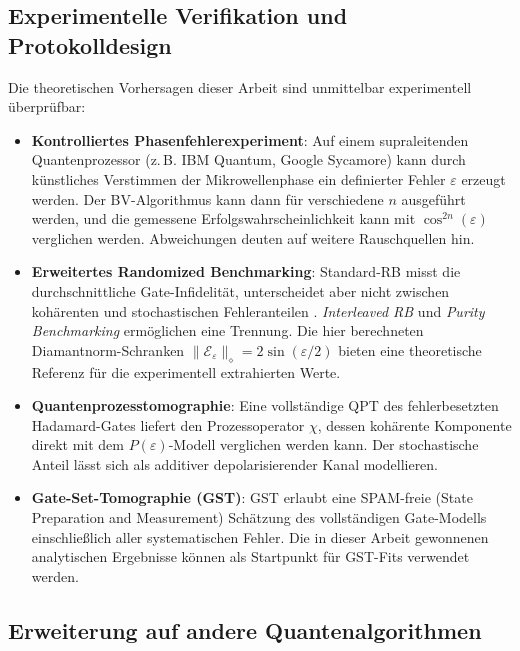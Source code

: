 ﻿\documentclass[11pt,a4paper]{article}
\theoremstyle{definition}
\newcommand{\eps}{\varepsilon}
\newcommand{\Fdiam}{\|\mathcal{E}_\eps\|_\diamond}
\begin{document}
\subsection{Experimentelle Verifikation und Protokolldesign}
\label{subsec:experiment}

Die theoretischen Vorhersagen dieser Arbeit sind unmittelbar experimentell
überprüfbar:

\begin{itemize}
  \item \textbf{Kontrolliertes Phasenfehlerexperiment}: Auf einem
        supraleitenden Quantenprozessor (z.\,B. IBM Quantum, Google Sycamore)
        kann durch künstliches Verstimmen der Mikrowellenphase ein definierter
        Fehler $\eps$ erzeugt werden.  Der BV-Algorithmus kann dann für
        verschiedene $n$ ausgeführt werden, und die gemessene
        Erfolgswahrscheinlichkeit kann mit $\cos^{2n}(\eps)$ verglichen werden.
        Abweichungen deuten auf weitere Rauschquellen hin.

  \item \textbf{Erweitertes Randomized Benchmarking}: Standard-RB misst
        die durchschnittliche Gate-Infidelität, unterscheidet aber nicht
        zwischen kohärenten und stochastischen Fehleranteilen \cite{Magesan2011}.
        \emph{Interleaved RB} \cite{Magesan2012} und \emph{Purity Benchmarking}
        \cite{Emerson2005} ermöglichen eine Trennung.  Die hier berechneten
        Diamantnorm-Schranken $\Fdiam = 2\sin(\eps/2)$ bieten eine
        theoretische Referenz für die experimentell extrahierten Werte.

  \item \textbf{Quantenprozesstomographie}: Eine vollständige QPT des
        fehlerbesetzten Hadamard-Gates liefert den Prozessoperator $\chi$,
        dessen kohärente Komponente direkt mit dem $P(\eps)$-Modell verglichen
        werden kann.  Der stochastische Anteil lässt sich als additiver
        depolarisierender Kanal modellieren.

  \item \textbf{Gate-Set-Tomographie (GST)}: GST \cite{Blume-Kohout2017}
        erlaubt eine SPAM-freie (State Preparation and Measurement) Schätzung
        des vollständigen Gate-Modells einschließlich aller systematischen
        Fehler.  Die in dieser Arbeit gewonnenen analytischen Ergebnisse können
        als Startpunkt für GST-Fits verwendet werden.
\end{itemize}

\subsection{Erweiterung auf andere Quantenalgorithmen}
\label{subsec:algorithms}
\end{document}
